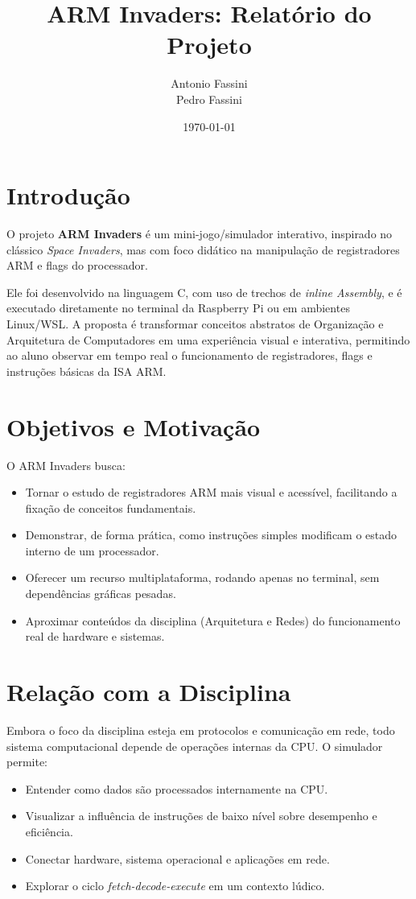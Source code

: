 \documentclass[12pt,a4paper]{report}
\title{ARM Invaders: Relatório do Projeto}
\author{Antonio Fassini \\ Pedro Fassini}
\date{\today}
\begin{document}
\maketitle
\tableofcontents
\onehalfspacing

\chapter{Introdução}
O projeto \textbf{ARM Invaders} é um mini-jogo/simulador interativo, inspirado no clássico \textit{Space Invaders}, mas com foco didático na manipulação de registradores ARM e flags do processador.  

Ele foi desenvolvido na linguagem C, com uso de trechos de \textit{inline Assembly}, e é executado diretamente no terminal da Raspberry Pi ou em ambientes Linux/WSL.  
A proposta é transformar conceitos abstratos de Organização e Arquitetura de Computadores em uma experiência visual e interativa, permitindo ao aluno observar em tempo real o funcionamento de registradores, flags e instruções básicas da ISA ARM.

\chapter{Objetivos e Motivação}
O ARM Invaders busca:
\begin{itemize}
    \item Tornar o estudo de registradores ARM mais visual e acessível, facilitando a fixação de conceitos fundamentais.
    \item Demonstrar, de forma prática, como instruções simples modificam o estado interno de um processador.
    \item Oferecer um recurso multiplataforma, rodando apenas no terminal, sem dependências gráficas pesadas.
    \item Aproximar conteúdos da disciplina (Arquitetura e Redes) do funcionamento real de hardware e sistemas.
\end{itemize}

\chapter{Relação com a Disciplina}
Embora o foco da disciplina esteja em protocolos e comunicação em rede, todo sistema computacional depende de operações internas da CPU.  
O simulador permite:
\begin{itemize}
    \item Entender como dados são processados internamente na CPU.
    \item Visualizar a influência de instruções de baixo nível sobre desempenho e eficiência.
    \item Conectar hardware, sistema operacional e aplicações em rede.
    \item Explorar o ciclo \textit{fetch-decode-execute} em um contexto lúdico.
\end{itemize}
\end{document}

